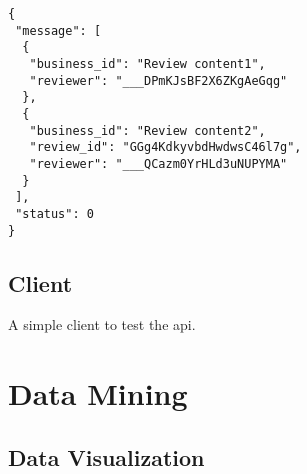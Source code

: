 \documentclass[12pt]{article}
\begin{document}
\begin{singlespacing}
\begin{lstlisting}
{
 "message": [
  {
   "business_id": "Review content1",
   "reviewer": "___DPmKJsBF2X6ZKgAeGqg"
  },
  {
   "business_id": "Review content2",
   "review_id": "GGg4KdkyvbdHwdwsC46l7g",
   "reviewer": "___QCazm0YrHLd3uNUPYMA"
  }
 ],
 "status": 0
}
\end{lstlisting}
\end{singlespacing}

\subsection{Client}
A simple client to test the api.

\section{Data Mining}\label{section-datamining}
\subsection{Data Visualization}
\end{document}

